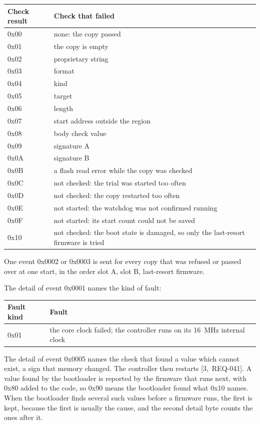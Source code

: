 \documentclass[11pt,a4paper]{article}
\begin{document}
{\footnotesize\noindent\begin{tabularx}{\textwidth}{@{}lX@{}}
\toprule
Check result & Check that failed \\
\midrule
0x00 & none: the copy passed \\
0x01 & the copy is empty \\
0x02 & proprietary string \\
0x03 & format \\
0x04 & kind \\
0x05 & target \\
0x06 & length \\
0x07 & start address outside the region \\
0x08 & body check value \\
0x09 & signature A \\
0x0A & signature B \\
0x0B & a flash read error while the copy was checked \\
0x0C & not checked: the trial was started too often \\
0x0D & not checked: the copy restarted too often \\
0x0E & not started: the watchdog was not confirmed running \\
0x0F & not started: its start count could not be saved \\
0x10 & not checked: the boot state is damaged, so only the last-resort firmware is tried \\
\bottomrule
\end{tabularx}}

\medskip
\noindent One event 0x0002 or 0x0003 is sent for every copy that was refused or passed over at
one start, in the order slot A, slot B, last-resort firmware.

\medskip
\noindent The detail of event 0x0001 names the kind of fault:

{\footnotesize\noindent\begin{tabularx}{\textwidth}{@{}lX@{}}
\toprule
Fault kind & Fault \\
\midrule
0x01 & the core clock failed; the controller runs on its 16~MHz internal clock \\
\bottomrule
\end{tabularx}}

\medskip
\noindent The detail of event 0x0005 names the check that found a value which cannot exist,
a sign that memory changed. The controller then restarts \mbox{[3,~REQ-041]}. A value found by
the bootloader is reported by the firmware that runs next, with 0x80 added to the code, so
0x90 means the bootloader found what 0x10 names. When the bootloader finds several such values
before a firmware runs, the first is kept, because the first is usually the cause, and the
second detail byte counts the ones after it.
\end{document}
